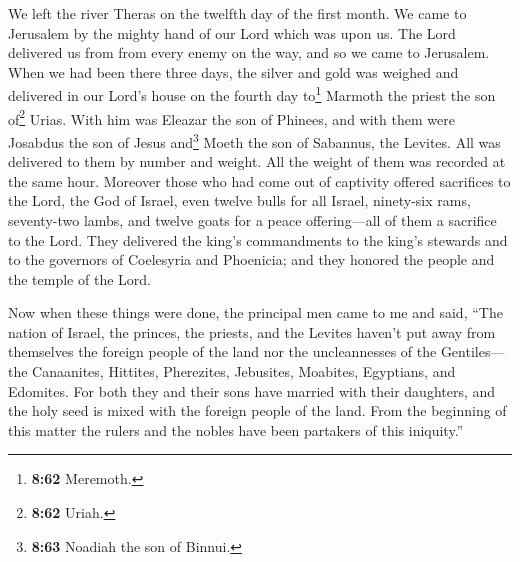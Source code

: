  We left the river Theras on the twelfth day of the first
month. We came to Jerusalem by the mighty hand of our Lord which was
upon us. The Lord delivered us from from every enemy on the way, and so
we came to Jerusalem.  When we had been there three days,
the silver and gold was weighed and delivered in our Lord's house on the
fourth day to\footnote{\textbf{8:62} Meremoth.} Marmoth the priest the
son of\footnote{\textbf{8:62} Uriah.} Urias.  With him
was Eleazar the son of Phinees, and with them were Josabdus the son of
Jesus and\footnote{\textbf{8:63} Noadiah the son of Binnui.} Moeth the
son of Sabannus, the Levites. All was delivered to them by number and
weight.  All the weight of them was recorded at the same
hour.  Moreover those who had come out of captivity
offered sacrifices to the Lord, the God of Israel, even twelve bulls for
all Israel, ninety-six rams,  seventy-two lambs, and
twelve goats for a peace offering---all of them a sacrifice to the Lord.
 They delivered the king's commandments to the king's
stewards and to the governors of Coelesyria and Phoenicia; and they
honored the people and the temple of the Lord.

 Now when these things were done, the principal men came
to me and said,  ``The nation of Israel, the princes, the
priests, and the Levites haven't put away from themselves the foreign
people of the land nor the uncleannesses of the Gentiles---the
Canaanites, Hittites, Pherezites, Jebusites, Moabites, Egyptians, and
Edomites.  For both they and their sons have married with
their daughters, and the holy seed is mixed with the foreign people of
the land. From the beginning of this matter the rulers and the nobles
have been partakers of this iniquity.''

